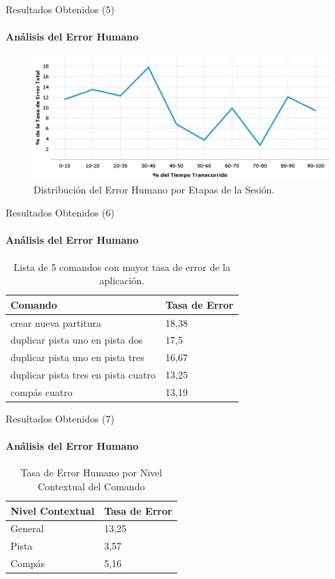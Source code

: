 \begin{frame}{Resultados Obtenidos (5)}
\framesubtitle{An\'alisis del Error Humano}
\begin{figure}[ht]
\centering
\includegraphics[width=1\linewidth]{./graphics/error_tiempo.png}
\caption{Distribuci\'on del Error Humano por Etapas de la Sesi\'on.}
\label{figure:gerror-tiempo}
\end{figure}
\end{frame}

\begin{frame}{Resultados Obtenidos (6)}
\framesubtitle{An\'alisis del Error Humano}
\begin{table}[H]
\centering
\footnotesize
\caption{Lista de 5 comandos con mayor tasa de error de la aplicaci\'on.}
\begin{tabular}{|l|p{2cm}|}
\hline
Comando & Tasa de Error \\
\hline
crear nueva partitura & 18,38 \\
duplicar pista uno en pista dos & 17,5 \\
duplicar pista uno en pista tres & 16,67 \\
duplicar pista tres en pista cuatro & 13,25 \\
comp\'as cuatro & 13,19 \\
\hline
\end{tabular}
\label{sec:tabla-lista-comandos-error}
\end{table}
\end{frame}


\begin{frame}{Resultados Obtenidos (7)}
\framesubtitle{An\'alisis del Error Humano}
\begin{table}[H]
\centering
\footnotesize
\caption{Tasa de Error Humano por Nivel Contextual del Comando}
\begin{tabular}{|p{2cm}|p{1.6cm}|}
\hline
Nivel Contextual & Tasa de Error \\
\hline
General & 13,25 \\
Pista & 3,57 \\
Comp\'as & 5,16 \\
\hline
\end{tabular}
\label{sec:error-contexto}
\end{table}
\end{frame}


